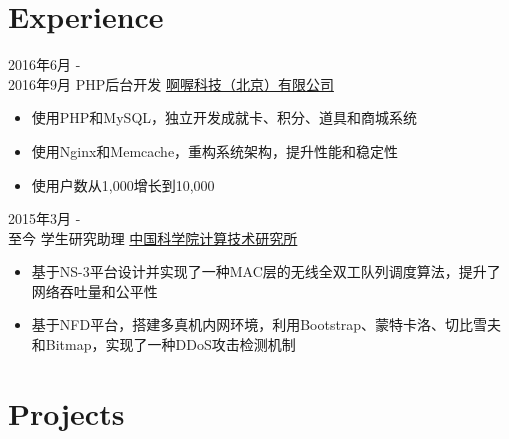 \documentclass[a4paper]{twentysecondcv} %
\begin{document}
\makeprofile %



\section{Experience}

\begin{twenty} %
	\twentyitem
    	{2016年6月 - \\2016年9月}
        {PHP后台开发}
        {\href{http://www.runorout.cn/}{啊喔科技（北京）有限公司}}
        {}
        {
        {\begin{itemize}
        \item 使用PHP和MySQL，独立开发成就卡、积分、道具和商城系统
        \item 使用Nginx和Memcache，重构系统架构，提升性能和稳定性
        \item 使用户数从1,000增长到10,000
    \end{itemize}}
        }
    
    \twentyitem
	    {2015年3月 - \\至今}
	    {学生研究助理}
	    {\href{http://english.ict.cas.cn/}{中国科学院计算技术研究所}}
	    {}
	    {
    	{\begin{itemize}
    			\item 基于NS-3平台设计并实现了一种MAC层的无线全双工队列调度算法，提升了网络吞吐量和公平性
    			\item 基于NFD平台，搭建多真机内网环境，利用Bootstrap、蒙特卡洛、切比雪夫和Bitmap，实现了一种DDoS攻击检测机制
    	\end{itemize}}
    }
        
\end{twenty}


\section{Projects}
\end{document}
